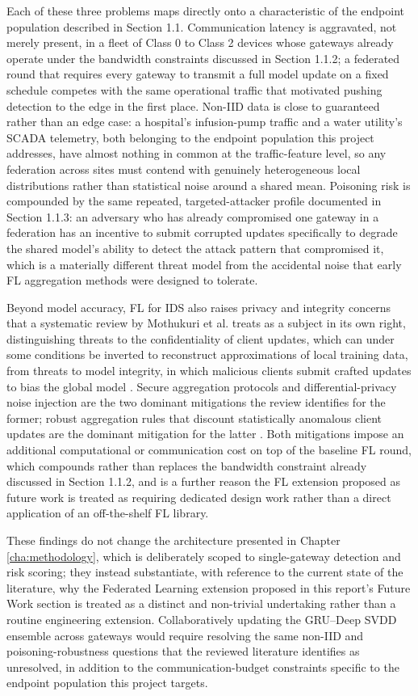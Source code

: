 Each of these three problems maps directly onto a characteristic of the endpoint population described in Section 1.1. Communication latency is aggravated, not merely present, in a fleet of Class 0 to Class 2 devices whose gateways already operate under the bandwidth constraints discussed in Section 1.1.2; a federated round that requires every gateway to transmit a full model update on a fixed schedule competes with the same operational traffic that motivated pushing detection to the edge in the first place. Non-IID data is close to guaranteed rather than an edge case: a hospital's infusion-pump traffic and a water utility's SCADA telemetry, both belonging to the endpoint population this project addresses, have almost nothing in common at the traffic-feature level, so any federation across sites must contend with genuinely heterogeneous local distributions rather than statistical noise around a shared mean. Poisoning risk is compounded by the same repeated, targeted-attacker profile documented in Section 1.1.3: an adversary who has already compromised one gateway in a federation has an incentive to submit corrupted updates specifically to degrade the shared model's ability to detect the attack pattern that compromised it, which is a materially different threat model from the accidental noise that early FL aggregation methods were designed to tolerate.

Beyond model accuracy, FL for IDS also raises privacy and integrity concerns that a systematic review by Mothukuri et al. treats as a subject in its own right, distinguishing threats to the confidentiality of client updates, which can under some conditions be inverted to reconstruct approximations of local training data, from threats to model integrity, in which malicious clients submit crafted updates to bias the global model \cite{Mothukuri2021}. Secure aggregation protocols and differential-privacy noise injection are the two dominant mitigations the review identifies for the former; robust aggregation rules that discount statistically anomalous client updates are the dominant mitigation for the latter \cite{Mothukuri2021}. Both mitigations impose an additional computational or communication cost on top of the baseline FL round, which compounds rather than replaces the bandwidth constraint already discussed in Section 1.1.2, and is a further reason the FL extension proposed as future work is treated as requiring dedicated design work rather than a direct application of an off-the-shelf FL library.

These findings do not change the architecture presented in Chapter \ref{cha:methodology}, which is deliberately scoped to single-gateway detection and risk scoring; they instead substantiate, with reference to the current state of the literature, why the Federated Learning extension proposed in this report's Future Work section is treated as a distinct and non-trivial undertaking rather than a routine engineering extension. Collaboratively updating the GRU--Deep SVDD ensemble across gateways would require resolving the same non-IID and poisoning-robustness questions that the reviewed literature identifies as unresolved, in addition to the communication-budget constraints specific to the endpoint population this project targets.

